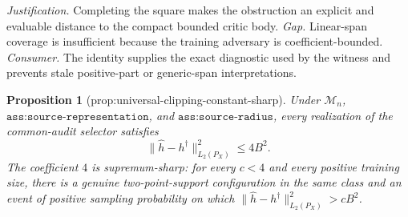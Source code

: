 \documentclass{article}
\newtheorem{proposition}{Proposition}
\begin{document}
\par\smallskip\noindent \textit{Justification.} Completing the square makes the obstruction an explicit and evaluable distance to the compact bounded critic body. \textit{Gap.} Linear-span coverage is insufficient because the training adversary is coefficient-bounded. \textit{Consumer.} The identity supplies the exact diagnostic used by the witness and prevents stale positive-part or generic-span interpretations.

\begin{proposition}[prop:universal-clipping-constant-sharp]\label{prop:universal-clipping-constant-sharp}
Under \(\mathcal M_n\), \(\texttt{ass:source-representation}\), and \(\texttt{ass:source-radius}\), every realization of the common-audit selector satisfies
\[
 \|\widehat h-h^\dagger\|_{L_2(P_X)}^2\le4B^2.
\]
The coefficient \(4\) is supremum-sharp: for every \(c<4\) and every positive training size, there is a genuine two-point-support configuration in the same class and an event of positive sampling probability on which \(\|\widehat h-h^\dagger\|_{L_2(P_X)}^2>cB^2\).
\end{proposition}
\end{document}

